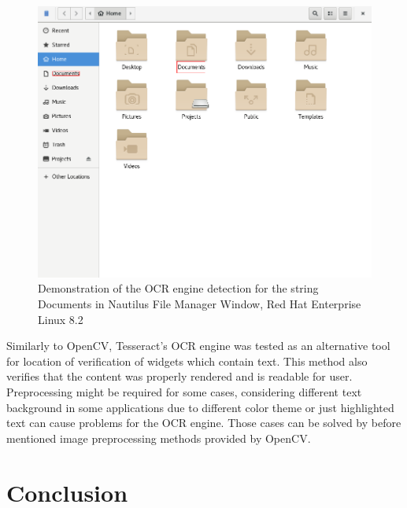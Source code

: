 \begin{figure}[hbt]
	\centering
	\includegraphics[width=1\textwidth]{obrazky-figures/ocr+nautilus.png}
	\caption{Demonstration of the OCR engine detection for the string Documents in Nautilus File Manager Window, Red Hat Enterprise Linux 8.2}
	\label{ocr_nautilus}
\end{figure}

Similarly to OpenCV, Tesseract's OCR engine was tested as an alternative tool for location of verification of widgets which contain text. This method also verifies that the content was properly rendered and is readable for user. Preprocessing might be required for some cases, considering different text background in some applications due to different color theme or just highlighted text can cause problems for the OCR engine. Those cases can be solved by before mentioned image preprocessing methods provided by OpenCV. 

\section{Conclusion}